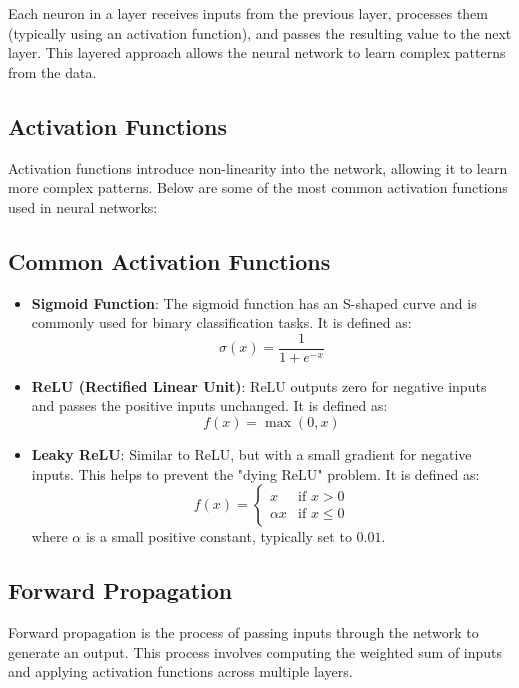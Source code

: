 \documentclass{article}
\begin{document}
Each neuron in a layer receives inputs from the previous layer, processes them (typically using an activation function), and passes the resulting value to the next layer. This layered approach allows the neural network to learn complex patterns from the data.

\subsection{Activation Functions}

Activation functions introduce non-linearity into the network, allowing it to learn more complex patterns. Below are some of the most common activation functions used in neural networks:

\subsection*{Common Activation Functions}
\begin{itemize}
    \item \textbf{Sigmoid Function}: The sigmoid function has an S-shaped curve and is commonly used for binary classification tasks. It is defined as:
    \[
    \sigma(x) = \frac{1}{1 + e^{-x}}
    \]

    \item \textbf{ReLU (Rectified Linear Unit)}: ReLU outputs zero for negative inputs and passes the positive inputs unchanged. It is defined as:
    \[
    f(x) = \max(0, x)
    \]

    \item \textbf{Leaky ReLU}: Similar to ReLU, but with a small gradient for negative inputs. This helps to prevent the "dying ReLU" problem. It is defined as:
    \[
    f(x) = 
    \begin{cases} 
      x & \text{if } x > 0 \\
      \alpha x & \text{if } x \leq 0
    \end{cases}
    \]
    where \( \alpha \) is a small positive constant, typically set to \( 0.01 \).
\end{itemize}

\subsection{Forward Propagation}

Forward propagation is the process of passing inputs through the network to generate an output. This process involves computing the weighted sum of inputs and applying activation functions across multiple layers.
\end{document}
